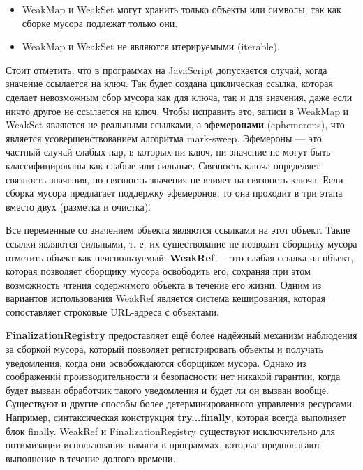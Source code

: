 \begin{itemize}[label*=---]
	\item WeakMap и WeakSet могут хранить только объекты или символы, так как сборке мусора подлежат только они.
	\item WeakMap и WeakSet не являются итерируемыми (iterable).
\end{itemize}

Стоит отметить, что в программах на JavaScript допускается случай, когда значение ссылается на ключ. Так будет создана циклическая ссылка, которая сделает невозможным сбор мусора как для ключа, так и для значения, даже если ничто другое не ссылается на ключ. Чтобы исправить это, записи в WeakMap и WeakSet являются не реальными ссылками, а \textbf{эфемеронами} (ephemerons), что является усовершенствованием алгоритма mark-sweep. Эфемероны \cite{js_ephemerons}--- это частный случай слабых пар, в которых ни ключ, ни значение не могут быть классифицированы как слабые или сильные. Связность ключа определяет связность значения, но связность значения не влияет на связность ключа. Если сборка мусора предлагает поддержку эфемеронов, то она проходит в три этапа вместо двух (разметка и очистка). \cite{js_memory}

Все переменные со значением объекта являются ссылками на этот объект. Такие ссылки являются сильными, т. е. их существование не позволит сборщику мусора отметить объект как неиспользуемый. \textbf{WeakRef} --- это слабая ссылка на объект, которая позволяет сборщику мусора освободить его, сохраняя при этом возможность чтения содержимого объекта в течение его жизни. Одним из вариантов использования WeakRef является система кеширования, которая сопоставляет строковые URL-адреса с объектами. \cite{js_memory}

\textbf{FinalizationRegistry} предоставляет ещё более надёжный механизм наблюдения за сборкой мусора, который позволяет регистрировать объекты и получать уведомления, когда они освобождаются сборщиком мусора. Однако из соображений производительности и безопасности нет никакой гарантии, когда будет вызван обработчик такого уведомления и будет ли он вызван вообще. Существуют и другие способы более детерминированного управления ресурсами. Например, синтаксическая конструкция \textbf{try...finally}, которая всегда выполняет блок finally. WeakRef и FinalizationRegistry существуют исключительно для оптимизации использования памяти в программах, которые предполагают выполнение в течение долгого времени. \cite{js_memory}

